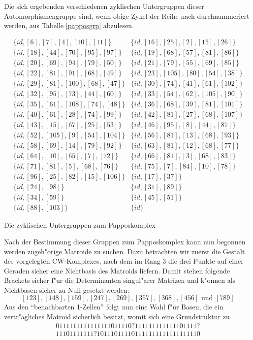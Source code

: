 Die sich ergebenden verschiedenen zyklischen Untergruppen dieser
Automorphismengruppe sind, wenn obige Zykel der Reihe nach durchnummeriert
werden, aus Tabelle \ref{papposgrp} abzulesen.

\begin{table}%
{\footnotesize $$\begin{array}{ll}
\{id,[6],[7],[4],[10],[11]\} & \{id,[16],[25],[2],[15],[26]\}\\
\{id,[18],[44],[70],[95],[97]\} & \{id,[19],[68],[57],[81],[86]\}\\
\{id,[20],[69],[94],[79],[50]\} & \{id,[21],[79],[55],[69],[85]\}\\
\{id,[22],[81],[91],[68],[49]\} & \{id,[23],[105],[80],[54],[38]\}\\
\{id,[29],[81],[100],[68],[47]\} & \{id,[30],[74],[41],[61],[102]\}\\
\{id,[32],[95],[73],[44],[60]\} & \{id,[33],[54],[62],[105],[90]\}\\
\{id,[35],[61],[108],[74],[48]\} & \{id,[36],[68],[39],[81],[101]\}\\
\{id,[40],[61],[28],[74],[99]\} & \{id,[42],[81],[27],[68],[107]\}\\
\{id,[43],[15],[67],[25],[53]\} & \{id,[46],[95],[8],[44],[87]\}\\
\{id,[52],[105],[9],[54],[104]\} & \{id,[56],[81],[13],[68],[93]\}\\
\{id,[58],[69],[14],[79],[92]\} & \{id,[63],[81],[12],[68],[77]\}\\
\{id,[64],[10],[65],[7],[72]\} & \{id,[66],[81],[3],[68],[83]\}\\
\{id,[71],[81],[5],[68],[76]\} & \{id,[75],[7],[84],[10],[78]\}\\
\{id,[96],[25],[82],[15],[106]\} & \{id,[17],[37]\}\\
\{id,[24],[98]\} & \{id,[31],[89]\}\\
\{id,[34],[59]\} & \{id,[45],[51]\}\\
\{id,[88],[103]\} & \{id\}
\end{array}$$}
\caption{Die zyklischen Untergruppen zum Papposkomplex}
\label{papposgrp}
\end{table}

Nach der Bestimmung dieser Gruppen zum Papposkomplex kann nun begonnen werden
zugeh"orige Matroide zu suchen. Dazu betrachten wir zuerst die Gestalt des
vorgelegten CW-Komplexes, nach dem im Rang 3 die drei Punkte auf einer Geraden
sicher eine Nichtbasis des Matroids liefern. Damit stehen folgende Brackets
sicher f"ur die Determinanten singul"arer Matrizen und k"onnen als Nichtbasen
sicher zu Null gesetzt werden:
$$[123],[148],[159],[247],[269],[357],[368],[456]\mbox{ und }[789]$$
Aus den "`benachbarten 1-Zellen"' folgt nun eine Wahl f"ur Basen, die
ein vertr"agliches Matroid sicherlich besitzt, womit sich eine
Grundstruktur zu
{\tt $$
\begin{array}{c}
0111111111111111011110?111111111111101111?\\
11101111111?101110111101111111111111111110
\end{array}
$$}

